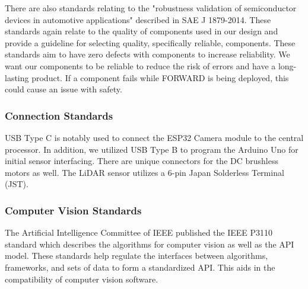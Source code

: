 \noindent There are also standards relating to the "robustness validation of semiconductor devices in automotive applications" described in SAE J 1879-2014. These standards again relate to the quality of components used in our design and provide a guideline for selecting quality, specifically reliable, components. These standards aim to have zero defects with components to increase reliability. We want our components to be reliable to reduce the risk of errors and have a long-lasting product. If a component fails while FORWARD is being deployed, this could cause an issue with safety.\cite{sae18792014}

\subsubsection{Connection Standards}
\noindent USB Type C is notably used to connect the ESP32 Camera module to the central processor. In addition, we utilized USB Type B to program the Arduino Uno for initial sensor interfacing. There are unique connectors for the DC brushless motors as well. The LiDAR sensor utilizes a 6-pin Japan Solderless Terminal (JST).

\subsubsection{Computer Vision Standards}
\noindent The Artificial Intelligence Committee of IEEE published the IEEE P3110 standard which describes the algorithms for computer vision as well as the API model. These standards help regulate the interfaces between algorithms, frameworks, and sets of data to form a standardized API. This aids in the compatibility of computer vision software. \cite{ieeep3110}

